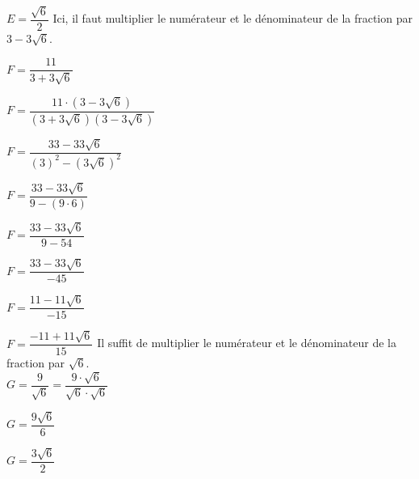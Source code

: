 \documentclass[a4paper,12pt]{report}
\begin{document}
\begin{cora}
\begin{tasks}
\medskip
 $E={{\dfrac{\sqrt{6}}{2}}}$
\task Ici, il faut multiplier le numérateur et le dénominateur de la fraction par  $3-3\sqrt{6}$.

\medskip
$F=\dfrac{ 11 }{3+3\sqrt{6}}$

\medskip
$F=\dfrac{ 11\cdot (3-3\sqrt{6}) }{(3+3\sqrt{6})(3-3\sqrt{6})}$

\medskip
$F=\dfrac{ 33 -33\sqrt{6}}{(3)^2-\left(3\sqrt{6}\right)^2}$ 

\medskip
$F=\dfrac{ 33 -33\sqrt{6}}{9-(9\cdot6)}$

\medskip
$F=\dfrac{ 33 -33\sqrt{6}}{9-54}$

\medskip
$F=\dfrac{ 33 -33\sqrt{6}}{-45}$

\medskip
$F=\dfrac{11 -11\sqrt{6}}{-15}$

\medskip
$F={{\dfrac{-11 +11\sqrt{6}}{15}}}$
\task Il suffit de multiplier le numérateur et le dénominateur de la fraction par $\sqrt{6}$.\\$G=\dfrac{ 9 }{\sqrt{6}}=\dfrac{ 9 \cdot \sqrt{6}} {\sqrt{6} \cdot \sqrt{6}} $

\medskip
$G=\dfrac{9\sqrt{6}}{6}$

\medskip
 $G={{\dfrac{3 \sqrt{6}}{2}}}$
\end{tasks}


\end{cora}
\end{document}
